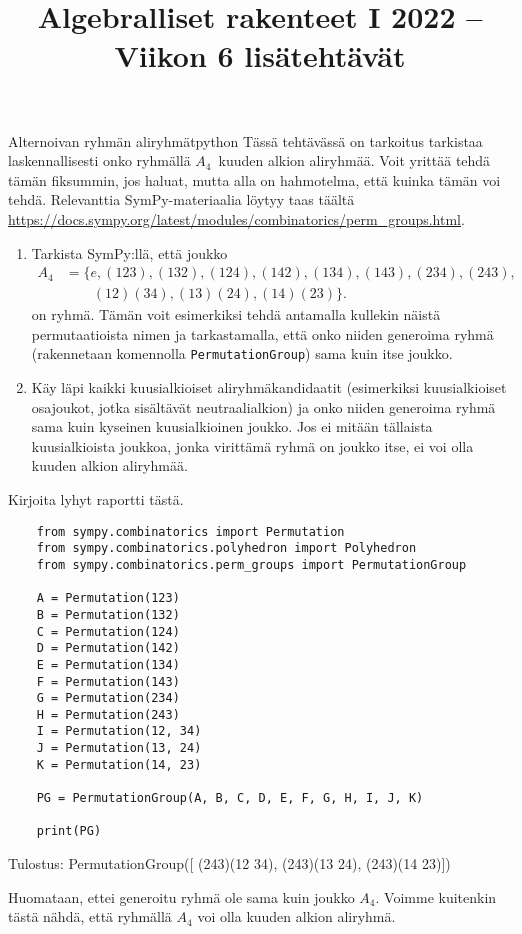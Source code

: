 \documentclass[11pt,a4paper]{amsart}
\title{Algebralliset rakenteet I 2022 -- Viikon 6 lisätehtävät}
\newcommand{\1}{\mathbf{1}}
\begin{document}
\maketitle

\begin{CExercises}{Alternoivan ryhmän aliryhmät}{python}
  Tässä tehtävässä on tarkoitus tarkistaa laskennallisesti onko ryhmällä $A_4$ kuuden alkion aliryhmää. Voit yrittää tehdä tämän fiksummin, jos haluat, mutta alla on hahmotelma, että kuinka tämän voi tehdä. Relevanttia SymPy-materiaalia löytyy taas täältä \url{https://docs.sympy.org/latest/modules/combinatorics/perm_groups.html}.

  \medskip

  \begin{enumerate}
    \item Tarkista SymPy:llä, että joukko
          \begin{align*}
            A_4 & =\{e,(123),(132),(124),(142),(134),(143),(234),(243), \\
                & \qquad (12)(34),(13)(24),(14)(23)\}.
          \end{align*}
          on ryhmä. Tämän voit esimerkiksi tehdä antamalla kullekin näistä permutaatioista nimen ja tarkastamalla, että onko niiden generoima ryhmä (rakennetaan komennolla {\tt PermutationGroup}) sama kuin itse joukko.
    \item Käy läpi kaikki kuusialkioiset aliryhmäkandidaatit (esimerkiksi kuusialkioiset osajoukot, jotka sisältävät neutraalialkion) ja onko niiden generoima ryhmä sama kuin kyseinen kuusialkioinen joukko. Jos ei mitään tällaista kuusialkioista joukkoa, jonka virittämä ryhmä on joukko itse, ei voi olla kuuden alkion aliryhmää.
  \end{enumerate}
  Kirjoita lyhyt raportti tästä.
\end{CExercises}
\begin{Solution}
  \begin{lstlisting}
    from sympy.combinatorics import Permutation
    from sympy.combinatorics.polyhedron import Polyhedron
    from sympy.combinatorics.perm_groups import PermutationGroup

    A = Permutation(123)
    B = Permutation(132)
    C = Permutation(124)
    D = Permutation(142)
    E = Permutation(134)
    F = Permutation(143)
    G = Permutation(234)
    H = Permutation(243)
    I = Permutation(12, 34)
    J = Permutation(13, 24)
    K = Permutation(14, 23)

    PG = PermutationGroup(A, B, C, D, E, F, G, H, I, J, K)

    print(PG)
  \end{lstlisting}
  Tulostus: PermutationGroup([
    (243)(12 34),
    (243)(13 24),
    (243)(14 23)])
  
    Huomataan, ettei generoitu ryhmä ole sama kuin joukko $A_4$. Voimme kuitenkin tästä nähdä, että ryhmällä $A_4$ voi olla kuuden alkion aliryhmä.
\end{Solution}
\end{document}
